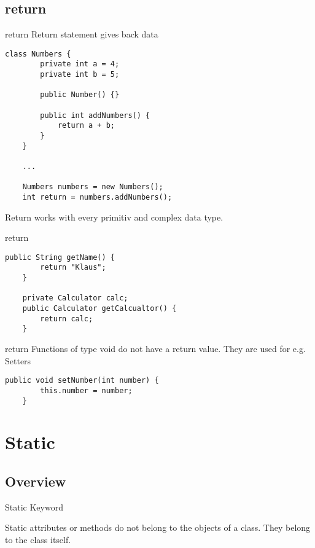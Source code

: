 \subsection{return}
\begin{frame}[fragile]{return}
    Return statement gives back data
    \begin{lstlisting}[basicstyle=\ttfamily\scriptsize]
    class Numbers {
        private int a = 4;
        private int b = 5;
        
        public Number() {}
        
        public int addNumbers() {
            return a + b;
        }
    }
    
    ...
    
    Numbers numbers = new Numbers();
    int return = numbers.addNumbers();\end{lstlisting}
    
    Return works with every primitiv and complex data type.
    
\end{frame}

\begin{frame}[fragile]{return}
    \begin{lstlisting}[basicstyle=\ttfamily\scriptsize]
    public String getName() {
        return "Klaus";
    }
    
    private Calculator calc;
    public Calculator getCalcualtor() {
        return calc;
    }\end{lstlisting}
\end{frame}

\begin{frame}[fragile]{return}
    Functions of type void do not have a return value.
    They are used for e.g. Setters
    \begin{lstlisting}[basicstyle=\ttfamily\scriptsize]
    public void setNumber(int number) {
        this.number = number;
    }\end{lstlisting}
\end{frame}

\section{Static}
\subsection{Overview}
\begin{frame}{Static Keyword}
    
    Static attributes or methods do not belong to the objects of a class.
    They belong to the class itself.

\end{frame}

